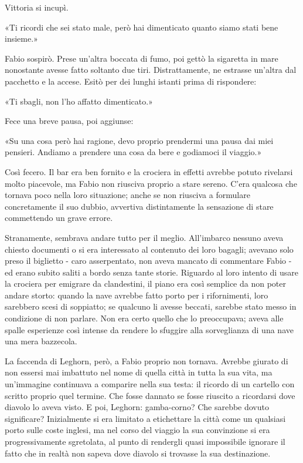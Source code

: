 Vittoria si incupì.

«Ti ricordi che sei stato male, però hai dimenticato quanto siamo stati bene insieme.»

Fabio sospirò. Prese un'altra boccata di fumo, poi gettò la sigaretta in mare nonostante avesse fatto soltanto due tiri. Distrattamente, ne estrasse un'altra dal pacchetto e la accese. Esitò per dei lunghi istanti prima di rispondere:

«Ti sbagli, non l'ho affatto dimenticato.»

Fece una breve pausa, poi aggiunse:

«Su una cosa però hai ragione, devo proprio prendermi una pausa dai miei pensieri. Andiamo a prendere una cosa da bere e godiamoci il viaggio.»

Così fecero. Il bar era ben fornito e la crociera in effetti avrebbe potuto rivelarsi molto piacevole, ma Fabio non riusciva proprio a stare sereno. C'era qualcosa che tornava poco nella loro situazione; anche se non riusciva a formulare concretamente il suo dubbio, avvertiva distintamente la sensazione di stare commettendo un grave errore.

Stranamente, sembrava andare tutto per il meglio. All'imbarco nessuno aveva chiesto documenti o si era interessato al contenuto dei loro bagagli; avevano solo preso il biglietto - caro asserpentato, non aveva mancato di commentare Fabio - ed erano subito saliti a bordo senza tante storie. Riguardo al loro intento di usare la crociera per emigrare da clandestini, il piano era così semplice da non poter andare storto: quando la nave avrebbe fatto porto per i rifornimenti, loro sarebbero scesi di soppiatto; se qualcuno li avesse beccati, sarebbe stato messo in condizione di non parlare. Non era certo quello che lo preoccupava; aveva alle spalle esperienze così intense da rendere lo sfuggire alla sorveglianza di una nave una mera bazzecola.

La faccenda di Leghorn, però, a Fabio proprio non tornava. Avrebbe giurato di non essersi mai imbattuto nel nome di quella città in tutta la sua vita, ma un'immagine continuava a comparire nella sua testa: il ricordo di un cartello con scritto proprio quel termine. Che fosse dannato se fosse riuscito a ricordarsi dove diavolo lo aveva visto. E poi, Leghorn: gamba-corno? Che sarebbe dovuto significare? Inizialmente si era limitato a etichettare la città come un qualsiasi porto sulle coste inglesi, ma nel corso del viaggio la sua convinzione si era progressivamente sgretolata, al punto di rendergli quasi impossibile ignorare il fatto che in realtà non sapeva dove diavolo si trovasse la sua destinazione.

